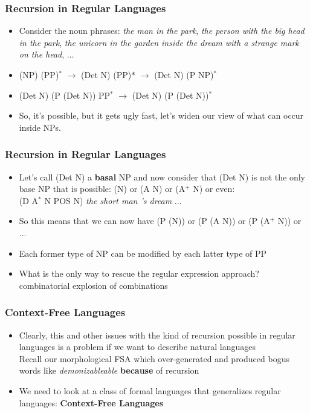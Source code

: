 \begin{frame}
\frametitle{Recursion in Regular Languages}
\begin{itemize}
\item Consider the noun phrases: {\em the man in the park}, {\em the person with the big head in the park}, {\em the unicorn in the garden inside the dream with a strange mark on the head}, $\ldots$
\item (NP) (PP)$^\ast$ $\rightarrow$ (Det N) (PP)$\ast$ $\rightarrow$ (Det N) (P NP)$^\ast$
\item (Det N) (P (Det N)) PP$^\ast$ $\rightarrow$ (Det N) (P (Det N))$^\ast$
\item So, it's possible, but it gets ugly fast, let's widen our view of what can occur inside NPs.
\end{itemize}

\end{frame}

\begin{frame}
\frametitle{Recursion in Regular Languages}
\begin{itemize}
\item Let's call (Det N) a {\bf basal} NP and now consider that (Det N) is not the only base NP that is possible: (N) or (A N) or (A$^+$ N) or even: \\
(D A$^\ast$ N POS N) {\em the short man 's dream} $\ldots$
\item So this means that we can now have (P (N)) or (P (A N)) or (P (A$^+$ N)) or $\ldots$
\item Each former type of NP can be modified by each latter type of PP
\item What is the only way to rescue the regular expression approach?  \\
{\color{red} combinatorial explosion of combinations}
\end{itemize}

\end{frame}

\begin{frame}
\frametitle{Context-Free Languages}
\begin{itemize}
\item Clearly, this and other issues with the kind of recursion possible in regular languages is a problem if we want to describe natural languages \\
{\color{red} Recall our morphological FSA which over-generated and produced bogus words like {\em demonizableable} {\bf because} of recursion}
\item We need to look at a class of formal languages that generalizes regular languages: {\bf Context-Free Languages}
\end{itemize}

\end{frame}

